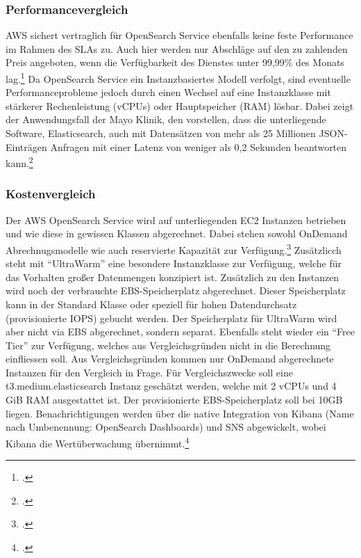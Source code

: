 \subsubsection{Performancevergleich}
\ac{AWS} sichert vertraglich für OpenSearch Service ebenfalls keine feste Performance im Rahmen des \acp{SLA} zu. Auch hier werden nur Abschläge auf den zu zahlenden Preis angeboten, wenn die Verfügbarkeit des Dienstes unter 99,99\% des Monats lag.\footcite[Vgl.][]{AmazonWebServicesInc..2019} Da OpenSearch Service ein Instanzbasiertes Modell verfolgt, sind eventuelle Performanceprobleme jedoch durch einen Wechsel auf eine Instanzklasse mit stärkerer Rechenleistung (vCPUs) oder Hauptspeicher (\ac{RAM}) lösbar. Dabei zeigt der Anwendungsfall der Mayo Klinik, den \citeauthor{Chen.2017} vorstellen, dass die unterliegende Software, Elasticsearch, auch mit Datensätzen von mehr als 25 Millionen \ac{JSON}-Einträgen Anfragen mit einer Latenz von weniger als 0,2 Sekunden beantworten kann.\footcite[Vgl.][]{Chen.2017}

\subsubsection{Kostenvergleich}
Der \ac{AWS} OpenSearch Service wird auf unterliegenden \ac{EC2} Instanzen betrieben und wie diese in gewissen Klassen abgerechnet. Dabei stehen sowohl OnDemand Abrechnugsmodelle wie auch reservierte Kapazität zur Verfügung.\footcite[Vgl. auch im Folgenden][]{AmazonWebServicesInc..o.J.w} Zusätzlicch steht mit \enquote{UltraWarm} eine besondere Instanzklasse zur Verfügung, welche für das Vorhalten großer Datenmengen konzipiert ist. Zusätzlich zu den Instanzen wird noch der verbrauchte \ac{EBS}-Speicherplatz abgerechnet. Dieser Speicherplatz kann in der Standard Klasse oder speziell für hohen Datendurchsatz (provisionierte \ac{IOPS}) gebucht werden. Der Speicherplatz für UltraWarm wird aber nicht via \ac{EBS} abgerechnet, sondern separat. Ebenfalls steht wieder ein \enquote{Free Tier} zur Verfügung, welches aus Vergleichsgründen nicht in die Berechnung einfliessen soll. Aus Vergleichsgründen kommen nur OnDemand abgerechnete Instanzen für den Vergleich in Frage. Für Vergleichszwecke soll eine t3.medium.elasticsearch Instanz geschätzt werden, welche mit 2 vCPUs und 4 GiB \ac{RAM} ausgestattet ist. Der provisionierte \ac{EBS}-Speicherplatz soll bei 10GB liegen.
Benachrichtigungen werden über die native Integration von Kibana (Name nach Umbenennung: OpenSearch Dashboards) und \ac{SNS} abgewickelt, wobei Kibana die Wertüberwachung übernimmt.\footcite[Vgl.][]{AmazonWebServicesInc..o.J.x}

